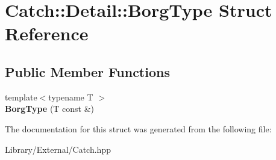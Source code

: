 \hypertarget{struct_catch_1_1_detail_1_1_borg_type}{}\section{Catch\+:\+:Detail\+:\+:Borg\+Type Struct Reference}
\label{struct_catch_1_1_detail_1_1_borg_type}
\subsection*{Public Member Functions}
\begin{DoxyCompactItemize}
\item 
\hypertarget{struct_catch_1_1_detail_1_1_borg_type_a780a9946ed0d654f0bfc043c8fc505d8}{}{\footnotesize template$<$typename T $>$ }\\{\bfseries Borg\+Type} (T const \&)\label{struct_catch_1_1_detail_1_1_borg_type_a780a9946ed0d654f0bfc043c8fc505d8}

\end{DoxyCompactItemize}


The documentation for this struct was generated from the following file\+:\begin{DoxyCompactItemize}
\item 
Library/\+External/Catch.\+hpp\end{DoxyCompactItemize}
